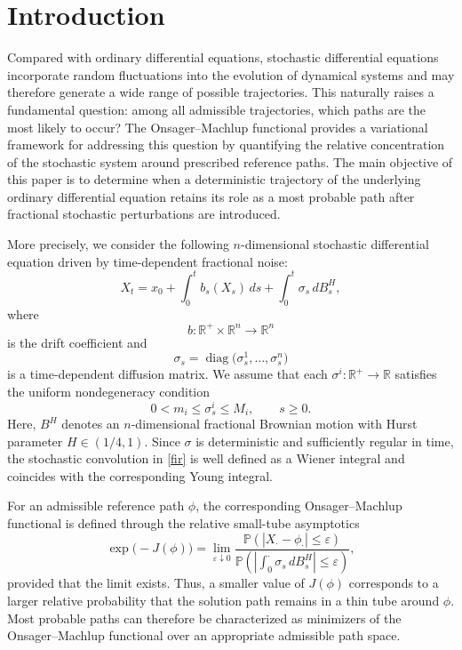 \documentclass[preprint,12pt]{elsarticle}
\theoremstyle{definition}
\theoremstyle{plain}
\begin{document}
\allowdisplaybreaks


\section{Introduction}
Compared with ordinary differential equations, stochastic differential
equations incorporate random fluctuations into the evolution of dynamical
systems and may therefore generate a wide range of possible trajectories.
This naturally raises a fundamental question: among all admissible
trajectories, which paths are the most likely to occur? The
Onsager--Machlup functional provides a variational framework for addressing
this question by quantifying the relative concentration of the stochastic
system around prescribed reference paths. The main objective of this paper is
to determine when a deterministic trajectory of the underlying ordinary
differential equation retains its role as a most probable path after
fractional stochastic perturbations are introduced.

More precisely, we consider the following $n$-dimensional stochastic
differential equation driven by time-dependent fractional noise:
\begin{equation}
\label{fir}
X_t
=
x_0
+
\int_0^t b_s(X_s)\,ds
+
\int_0^t \sigma_s\,dB_s^H,
\end{equation}
where
\begin{equation*}
b:\mathbb R^+\times\mathbb R^n\longrightarrow\mathbb R^n
\end{equation*}
is the drift coefficient and
\begin{equation*}
\sigma_s
=
\operatorname{diag}
\bigl(
\sigma_s^1,\ldots,\sigma_s^n
\bigr)
\end{equation*}
is a time-dependent diffusion matrix. We assume that each
$\sigma^i:\mathbb R^+\to\mathbb R$ satisfies the uniform nondegeneracy
condition
\begin{equation*}
0<m_i\leq \sigma_s^i\leq M_i,
\qquad
s\geq0.
\end{equation*}
Here, $B^H$ denotes an $n$-dimensional fractional Brownian motion with Hurst
parameter $H\in(1/4,1)$. Since $\sigma$ is deterministic and sufficiently
regular in time, the stochastic convolution in \eqref{fir} is well defined as
a Wiener integral and coincides with the corresponding Young integral.

For an admissible reference path $\phi$, the corresponding
Onsager--Machlup functional is defined through the relative small-tube
asymptotics
\begin{equation}
\exp\bigl(-J(\phi)\bigr)
=
\lim_{\varepsilon\downarrow0}
\frac{
\mathbb P
\left(
|X_\cdot-\phi_\cdot|
\leq
\varepsilon
\right)
}{
\mathbb P
\left(
\left|
\int_0^\cdot\sigma_s\,dB_s^H
\right|
\leq
\varepsilon
\right)
},
\end{equation}
provided that the limit exists. Thus, a smaller value of $J(\phi)$ corresponds
to a larger relative probability that the solution path remains in a thin
tube around $\phi$. Most probable paths can therefore be characterized as
minimizers of the Onsager--Machlup functional over an appropriate admissible
path space.
\end{document}
